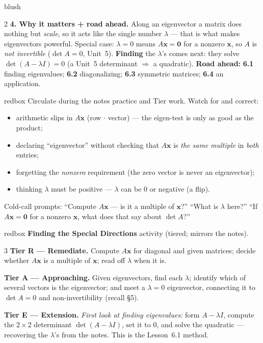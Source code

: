 \documentclass[10pt]{article}
\newcommand{\xx}{\mathbf{x}}
\newcommand{\zero}{\mathbf{0}}
\begin{document}
\begin{skillbox}[Lesson]{blush}
\begin{multicols}{2}
\textbf{4. Why it matters + road ahead.} Along an eigenvector a matrix does nothing but \emph{scale},
so it acts like the single number $\lambda$ --- that is what makes eigenvectors powerful. Special
case: $\lambda=0$ means $A\xx=\zero$ for a nonzero $\xx$, so $A$ is \emph{not invertible} ($\det A=0$,
Unit~5). \textbf{Finding} the $\lambda$'s comes next: they solve $\det(A-\lambda I)=0$ (a Unit~5
determinant $\Rightarrow$ a quadratic). \textbf{Road ahead:} \textbf{6.1} finding eigenvalues;
\textbf{6.2} diagonalizing; \textbf{6.3} symmetric matrices; \textbf{6.4} an application.
\end{multicols}
\end{skillbox}

\begin{skillbox}{redbox}
Circulate during the notes practice and Tier work. Watch for and correct:
\begin{itemize}[leftmargin=1.2em, nosep]
  \item arithmetic slips in $A\xx$ (row $\cdot$ vector) --- the eigen-test is only as good as the product;
  \item declaring ``eigenvector'' without checking that $A\xx$ is \emph{the same multiple} in \emph{both} entries;
  \item forgetting the \emph{nonzero} requirement (the zero vector is never an eigenvector);
  \item thinking $\lambda$ must be positive --- $\lambda$ can be $0$ or negative (a flip).
\end{itemize}
Cold-call prompts: ``Compute $A\xx$ --- is it a multiple of $\xx$?'' ``What is $\lambda$ here?''
``If $A\xx=\zero$ for a nonzero $\xx$, what does that say about $\det A$?''
\end{skillbox}

\begin{skillbox}{redbox}
\textbf{Finding the Special Directions} activity (tiered; mirrors the notes).
\begin{multicols}{3}
\textbf{Tier R --- Remediate.} Compute $A\xx$ for diagonal and given matrices; decide whether $A\xx$
is a multiple of $\xx$; read off $\lambda$ when it is.

\columnbreak
\textbf{Tier A --- Approaching.} Given eigenvectors, find each $\lambda$; identify which of several
vectors is the eigenvector; and meet a $\lambda=0$ eigenvector, connecting it to $\det A=0$ and
non-invertibility (recall §5).

\columnbreak
\textbf{Tier E --- Extension.} \emph{First look at finding eigenvalues:} form $A-\lambda I$, compute
the $2\times2$ determinant $\det(A-\lambda I)$, set it to $0$, and solve the quadratic --- recovering
the $\lambda$'s from the notes. This is the Lesson~6.1 method.
\end{multicols}
\end{skillbox}
\end{document}
